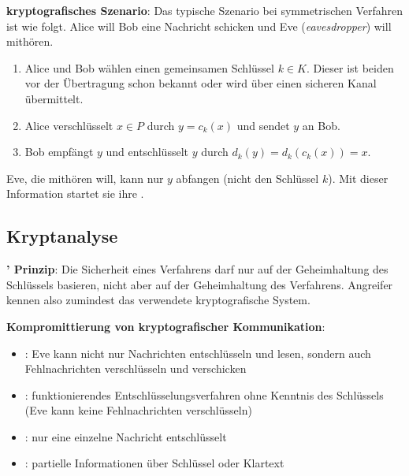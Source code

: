 \textbf{kryptografisches Szenario}:
Das typische Szenario bei symmetrischen Verfahren ist wie folgt.
Alice will Bob eine Nachricht schicken und Eve (\emph{eavesdropper}) will mithören.
\begin{enumerate}
    \item
    Alice und Bob wählen einen gemeinsamen Schlüssel $k \in K$.
    Dieser ist beiden vor der Übertragung schon bekannt oder wird über einen
    sicheren Kanal übermittelt.

    \item
    Alice verschlüsselt $x \in P$ durch $y = c_k(x)$ und sendet $y$ an Bob.

    \item
    Bob empfängt $y$ und entschlüsselt $y$ durch $d_k(y) = d_k(c_k(x)) = x$.
\end{enumerate}
Eve, die mithören will, kann nur $y$ abfangen (nicht den Schlüssel $k$).
Mit dieser Information startet sie ihre .

\pagebreak

\subsection{%
    Kryptanalyse%
}

\textbf{' Prinzip}:
Die Sicherheit eines Verfahrens darf nur auf der Geheimhaltung des Schlüssels basieren,
nicht aber auf der Geheimhaltung des Verfahrens.
Angreifer kennen also zumindest das verwendete kryptografische System.

\linie

\textbf{Kompromittierung von kryptografischer Kommunikation}:
\begin{itemize}
    \item
    :
    Eve kann nicht nur Nachrichten entschlüsseln und lesen, sondern auch
    Fehlnachrichten verschlüsseln und verschicken

    \item
    :
    funktionierendes Entschlüsselungsverfahren ohne Kenntnis des Schlüssels\\
    (Eve kann keine Fehlnachrichten verschlüsseln)

    \item
    :
    nur eine einzelne Nachricht entschlüsselt

    \item
    :
    partielle Informationen über Schlüssel oder Klartext
\end{itemize}

